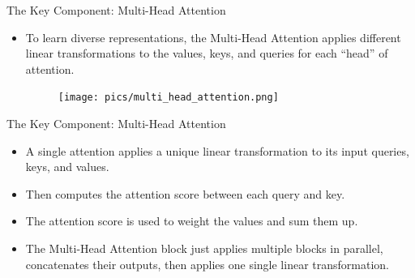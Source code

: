 \documentclass[handout]{beamer}
\begin{document}
\begin{frame}{The Key Component: Multi-Head Attention}
\begin{scriptsize}
\begin{itemize}
 \item To learn diverse representations, the Multi-Head Attention applies different linear transformations to the values, keys, and queries for each “head” of attention.
 
 
     \begin{figure}[h]
        	\texttt{[image: pics/multi\_head\_attention.png]}
        \end{figure}  
 

\end{itemize}

\end{scriptsize}

\end{frame}



\begin{frame}{The Key Component: Multi-Head Attention}
\begin{scriptsize}
\begin{itemize}

 \item A single attention applies a unique linear transformation to its input queries, keys, and values.
 
 \item Then computes the attention score between each query and key.
 
 \item The attention score is used to weight the values and sum them up.


\item The Multi-Head Attention block just applies multiple blocks in parallel, concatenates their outputs, then applies one single linear transformation. 
 
\end{itemize}

\end{scriptsize}

\end{frame}
\end{document}
